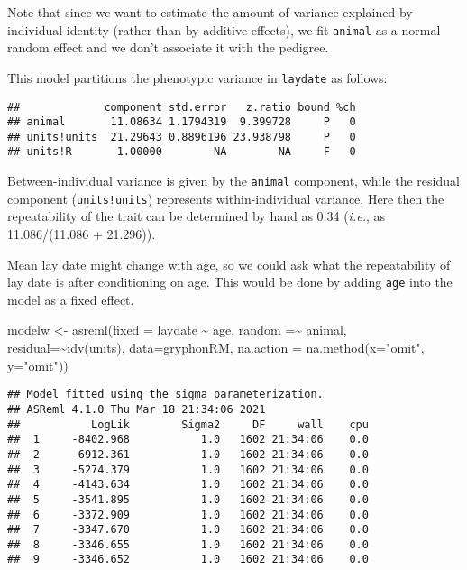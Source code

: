 \documentclass[
  12pt,
]{book}
\newenvironment{Shaded}{\begin{snugshade}}{\end{snugshade}}
\newcommand{\AttributeTok}[1]{\textcolor[rgb]{0.77,0.63,0.00}{#1}}
\newcommand{\FunctionTok}[1]{\textcolor[rgb]{0.00,0.00,0.00}{#1}}
\newcommand{\NormalTok}[1]{#1}
\newcommand{\OtherTok}[1]{\textcolor[rgb]{0.56,0.35,0.01}{#1}}
\newcommand{\SpecialCharTok}[1]{\textcolor[rgb]{0.00,0.00,0.00}{#1}}
\newcommand{\StringTok}[1]{\textcolor[rgb]{0.31,0.60,0.02}{#1}}
\begin{document}
Note that since we want to estimate the amount of variance explained by individual identity (rather than by additive effects), we fit \texttt{animal} as a normal random effect and we don't associate it with the pedigree.

This model partitions the phenotypic variance in \texttt{laydate} as follows:

\begin{Shaded}
\end{Shaded}

\begin{verbatim}
##             component std.error   z.ratio bound %ch
## animal       11.08634 1.1794319  9.399728     P   0
## units!units  21.29643 0.8896196 23.938798     P   0
## units!R       1.00000        NA        NA     F   0
\end{verbatim}

Between-individual variance is given by the \texttt{animal} component, while the residual component (\texttt{units!units}) represents within-individual variance. Here then the repeatability of the trait can be determined by hand as 0.34 (\emph{i.e.}, as 11.086/(11.086 + 21.296)).

Mean lay date might change with age, so we could ask what the repeatability of lay date is after conditioning on age. This would be done by adding \texttt{age} into the model as a fixed effect.

\begin{Shaded}
\begin{Highlighting}[]
\NormalTok{modelw }\OtherTok{\textless{}{-}} \FunctionTok{asreml}\NormalTok{(}\AttributeTok{fixed =}\NormalTok{ laydate }\SpecialCharTok{\textasciitilde{}}\NormalTok{ age,}
                 \AttributeTok{random =}\SpecialCharTok{\textasciitilde{}}\NormalTok{ animal,}
                 \AttributeTok{residual=}\SpecialCharTok{\textasciitilde{}}\FunctionTok{idv}\NormalTok{(units),}
                 \AttributeTok{data=}\NormalTok{gryphonRM,}
                 \AttributeTok{na.action =} \FunctionTok{na.method}\NormalTok{(}\AttributeTok{x=}\StringTok{"omit"}\NormalTok{, }\AttributeTok{y=}\StringTok{"omit"}\NormalTok{))}
\end{Highlighting}
\end{Shaded}

\begin{verbatim}
## Model fitted using the sigma parameterization.
## ASReml 4.1.0 Thu Mar 18 21:34:06 2021
##           LogLik        Sigma2     DF     wall    cpu
##  1     -8402.968           1.0   1602 21:34:06    0.0
##  2     -6912.361           1.0   1602 21:34:06    0.0
##  3     -5274.379           1.0   1602 21:34:06    0.0
##  4     -4143.634           1.0   1602 21:34:06    0.0
##  5     -3541.895           1.0   1602 21:34:06    0.0
##  6     -3372.909           1.0   1602 21:34:06    0.0
##  7     -3347.670           1.0   1602 21:34:06    0.0
##  8     -3346.655           1.0   1602 21:34:06    0.0
##  9     -3346.652           1.0   1602 21:34:06    0.0
\end{verbatim}
\end{document}
